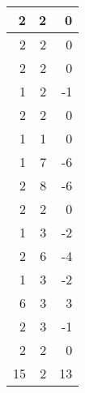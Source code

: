 \documentclass[11pt]{article}
\begin{document}
\begin{center}
\begin{tabular}{rrr}
       2  &          2  &         0  \\ \hline
       2  &          2  &         0  \\ \hline
       2  &          2  &         0  \\ \hline
       1  &          2  &        -1  \\ \hline
       2  &          2  &         0  \\ \hline
       1  &          1  &         0  \\ \hline
       1  &          7  &        -6  \\ \hline
       2  &          8  &        -6  \\ \hline
       2  &          2  &         0  \\ \hline
       1  &          3  &        -2  \\ \hline
       2  &          6  &        -4  \\ \hline
       1  &          3  &        -2  \\ \hline
       6  &          3  &         3  \\ \hline
       2  &          3  &        -1  \\ \hline
       2  &          2  &         0  \\ \hline
      15  &          2  &        13  \\ \hline
\end{tabular}
\end{center}
\end{document}
